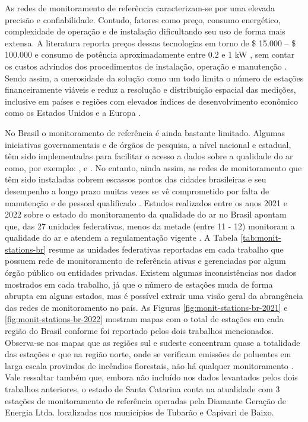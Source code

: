 As redes de monitoramento de referência caracterizam-se por uma elevada precisão e confiabilidade. Contudo, fatores como preço, consumo energético, complexidade de operação e de instalação dificultando seu uso de forma mais extensa. A literatura reporta preços dessas tecnologias em torno de \$ 15.000 – \$ 100.000 \cite{Concas2021LOW-COSTPREPRINT} e consumo de potência aproximadamente entre 0.2 e 1 kW \cite{Piedrahita2014TheMonitoring}, sem contar os custos advindos dos procedimentos de instalação, operação e manutenção \cite{Kumar2015,Ferreira2022}. Sendo assim, a onerosidade da solução como um todo limita o número de estações financeiramente viáveis e reduz a resolução e distribuição espacial das medições, inclusive em países e regiões com elevados índices de desenvolvimento econômico como os Estados Unidos e a Europa \cite{Kumar2015,Jiao2016CommunityStates}.

No Brasil o monitoramento de referência é ainda bastante limitado. Algumas iniciativas governamentais e de órgãos de pesquisa, a nível nacional e estadual, têm sido implementadas para facilitar o acesso a dados sobre a qualidade do ar como, por exemplo: \cite{CETESB2020RedesAr}, \cite{IEMA2020QualidadeAr} e \cite{IEMA/ES2020IEMAAr}. No entanto, ainda assim, as redes de monitoramento que têm sido instaladas cobrem escassos pontos das cidades brasileiras e seu desempenho a longo prazo muitas vezes se vê comprometido por falta de manutenção e de pessoal qualificado \cite{Oyama2017AIRBRAZIL}. Estudos realizados entre os anos 2021 e 2022 sobre o estado do monitoramento da qualidade do ar no Brasil apontam que, das 27 unidades federativas, menos da metade (entre 11 - 12) monitoram a qualidade do ar e atendem a regulamentação vigente \cite{Vormittag2021AnaliseBrasil,Ferreira2022}. A Tabela \ref{tab:monit-stations-br}  resume as unidades federativas reportadas em cada trabalho que possuem rede de monitoramento de referência ativas e gerenciadas por algum órgão público ou entidades privadas. Existem algumas inconsistências nos dados mostrados em cada trabalho, já que o número de estações muda de forma abrupta em alguns estados, mas é possível extrair uma visão geral da abrangência das redes de monitoramento no país. As Figuras \ref{fig:monit-stations-br-2021} e \ref{fig:monit-stations-br-2022} mostram mapas com o total de estações em cada região do Brasil conforme foi reportado pelos dois trabalhos mencionados. Observa-se nos mapas que as regiões sul e sudeste concentram quase a totalidade das estações \cite{Vormittag2021AnaliseBrasil,Ferreira2022} e que na região norte, onde se verificam emissões de poluentes em larga escala provindos de incêndios florestais, não há qualquer monitoramento \cite{Ferreira2022}. Vale ressaltar também que, embora não incluído nos dados levantados pelos dois trabalhos anteriores, o estado de Santa Catarina conta na atualidade com 3 estações de monitoramento de referência operadas pela Diamante Geração de Energia Ltda. localizadas nos municípios de Tubarão e Capivari de Baixo. 

